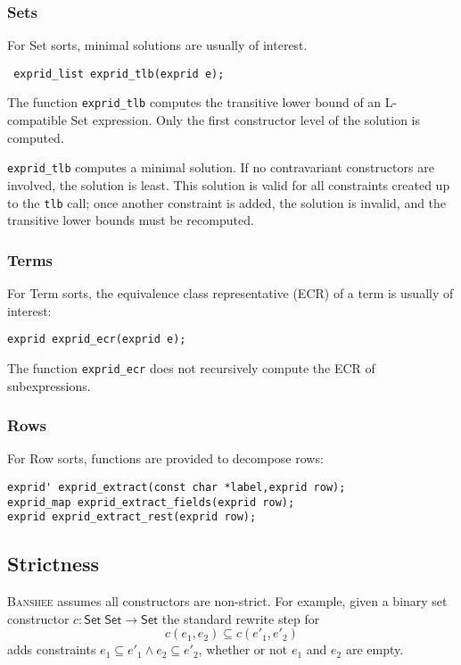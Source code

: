 \documentclass{article}
\newcommand{\banshee}{\textsc{Banshee}}
\newcommand{\Term}{\textsf{Term}}
\newcommand{\Set}{\textsf{Set}}
\newcommand{\Row}{\textsf{Row}}
\begin{document}
\subsubsection{Sets} 

For \Set{} sorts, minimal solutions are usually of interest.
\begin{verbatim}
 exprid_list exprid_tlb(exprid e);
\end{verbatim}
The function \texttt{exprid\_tlb} computes the transitive lower bound
of an L-compatible \Set{} expression. Only the first constructor level
of the solution is computed. 

\texttt{exprid\_tlb} computes a minimal solution. If no contravariant 
constructors are involved, the solution is least. This solution is valid
for all constraints created up to the \texttt{tlb} call; once another 
constraint is added, the solution is invalid, and the transitive lower bounds
must be recomputed.

\subsubsection{Terms}
For \Term{} sorts, the equivalence class representative (ECR) of a term is 
usually of interest:

\begin{verbatim}
exprid exprid_ecr(exprid e);
\end{verbatim}

The function \texttt{exprid\_ecr} does not recursively compute the ECR of 
subexpressions.

\subsubsection{Rows}

For \Row{} sorts, functions are provided to decompose rows:

\begin{verbatim}
exprid' exprid_extract(const char *label,exprid row);
exprid_map exprid_extract_fields(exprid row);
exprid exprid_extract_rest(exprid row);
\end{verbatim}

\subsection{Strictness}

\banshee{} assumes all constructors are non-strict. For example, given a 
binary set constructor $c : \Set{}\; \Set \rightarrow \Set$ the standard 
rewrite step for
$$
  c(e_1,e_2) \subseteq c(e'_1,e'_2)
$$
adds constraints $e_1 \subseteq e'_1 \wedge e_2\subseteq e'_2$, whether 
or not $e_1$ and $e_2$ are empty. 
\end{document}
